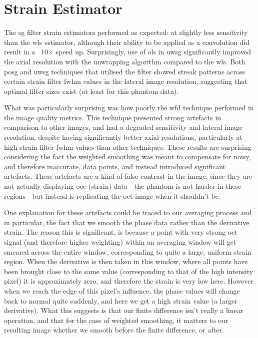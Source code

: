 \section{Strain Estimator}

The \ac{sg} filter strain estimators performed as expected: at slightly less sensitivity than the \ac{wls} estimator, although their ability to be applied as a convolution did result in a ~10$\times$ speed up. Surprisingly, use of \ac{ols} in \ac{uwsg} significantly improved the axial resolution with the unwrapping algorithm compared to the \ac{wls}. Both \ac{posg} and \ac{uwsg} techniques that utilised the filter showed streak patterns across certain strain filter \ac{fwhm} values in the lateral image resolution, suggesting that optimal filter sizes exist (at least for this phantom data). 

What was particularly surprising was how poorly the \ac{wfd} technique performed in the image quality metrics. This technique presented strong artefacts in comparison to other images, and had a degraded sensitivity and lateral image resolution, despite having significantly better axial resolutions, particularly at high strain filter \ac{fwhm} values than other techniques.
These results are surprising considering the fact the weighted smoothing was meant to compensate for noisy, and therefore inaccurate, data points, and instead introduced significant artefacts.
These artefacts are a kind of false contrast in the image, since they are not actually displaying \ac{oce} (strain) data - the phantom is not harder in these regions - but instead is replicating the \ac{oct} image when it shouldn't be. 

One explanation for these artefacts could be traced to our averaging process and in particular, the fact that we smooth the phase data rather than the derivative strain. The reason this is significant, is because a point with very strong \ac{oct} signal (and therefore higher weighting) within an averaging window will get smeared across the entire window, corresponding to quite a large, uniform strain region. When the derivative is then taken in this window, where all points have been brought close to the same value (corresponding to that of the high intensity pixel) it is approximately zero, and therefore the strain is very low here. However when we reach the edge of this pixel's influence, the phase values will change back to normal quite suddenly, and here we get a high strain value (a larger derivative). 
What this suggests is that our finite difference isn't really a linear operation, and that for the case of weighted smoothing, it matters to our resulting image whether we smooth before the finite difference, or after. 

